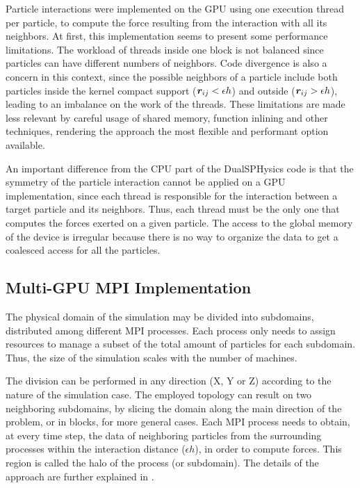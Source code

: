 Particle interactions were implemented on the \ac{GPU} using one execution thread per particle, to compute the force resulting from the interaction with all its neighbors. At first, this implementation seems to present some performance limitations. The workload of threads inside one block is not balanced since particles can have different numbers of neighbors. Code divergence is also a concern in this context, since the possible neighbors of a particle include both particles inside the kernel compact support ($\boldsymbol{r}_{ij}<\epsilon h$) and outside ($\boldsymbol{r}_{ij}>\epsilon h$), leading to an imbalance on the work of the threads. These limitations are made less relevant by careful usage of shared memory, function inlining and other techniques, rendering the approach the most flexible and performant option available. 

An important difference from the \ac{CPU} part of the DualSPHysics code is that the symmetry of the particle interaction cannot be applied on a \ac{GPU} implementation, since each thread is responsible for the interaction between a target particle and its neighbors. Thus, each thread must be the only one that computes the forces exerted on a given particle. The access to the global memory of the device is irregular because there is no way to organize the data to get a coalesced access for all the particles.

\subsection{Multi-\ac{GPU} \ac{MPI} Implementation}
%
The physical domain of the simulation may be divided into subdomains, distributed among different \ac{MPI} processes. Each process only needs to assign resources to manage a subset of the total amount of particles for each subdomain. Thus, the size of the simulation scales with the number of machines.

The division can be performed in any direction (X, Y or Z) according to the nature of the simulation case. The employed topology can result on two neighboring subdomains, by slicing the domain along the main direction of the problem, or in blocks, for more general cases. Each \ac{MPI} process needs to obtain, at every time step, the data of neighboring particles from the surrounding processes within the interaction distance ($\epsilon h$), in order to compute forces. This region is called the halo of the process (or subdomain). The details of the approach are further explained in \cite{Dominguez-2013b}.

